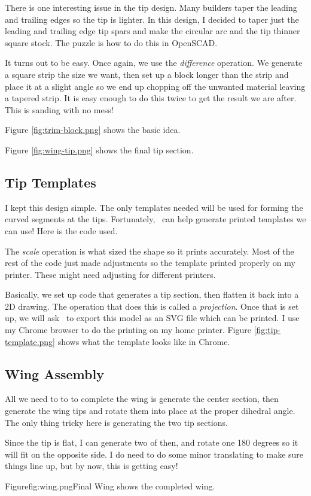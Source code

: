 There is one interesting issue in the tip design. Many builders taper the
leading and trailing edges so the tip is lighter. In this design, I decided to
taper just the leading and trailing edge tip spars and make the circular arc
and the tip thinner square stock. The puzzle is how to do this in OpenSCAD.

It turns out to be easy. Once again, we use the {\it difference} operation. We
generate a square strip the size we want, then set up a block longer than the
strip and place it at a slight angle so we end up chopping off the unwanted
material leaving a tapered strip. It is easy enough to do this twice to get the
result we are after. This is sanding with no mess!

Figure \ref{fig:trim-block.png} shows the basic idea.



Figure \ref{fig:wing-tip.png} shows the final tip section.


\subsection{Tip Templates}

I kept this design simple. The only templates needed will be used for forming
the curved segments at the tips. Fortunately, \osc\ can help generate
printed templates we can use! Here is the code used.


The {\it scale} operation is what sized the shape so it prints accurately. Most
of the rest of the code just made adjustments so the template printed properly
on my printer. These might need adjusting for different printers.

Basically, we set up code that generates a tip section, then flatten it back
into a 2D drawing. The operation that does this is called a {\it projection}.
Once that is set up, we will ask \osc\ to export this model as an SVG file
which can be printed. I use my Chrome browser to do the printing on my home
printer.  Figure \ref{fig:tip-template.png} shows what the template looks like
in Chrome.


\subsection{Wing Assembly}

All we need to to to complete the wing is generate the center section, then
generate the wing tips and rotate them into place at the proper dihedral angle.
The only thing tricky here is generating the two tip sections.

Since the tip is flat, I can generate two of then, and rotate one 180 degrees
so it will fit on the opposite side. I do need to do some minor translating to
make sure things line up, but by now, this is getting easy!

Figure{fig:wing.png}{Final Wing} shows the completed wing.

